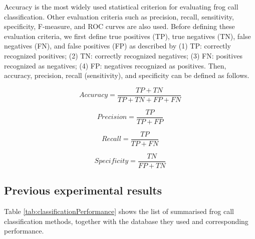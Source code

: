 Accuracy is the most widely used statistical criterion for evaluating frog call classification. Other evaluation criteria such as precision, recall, sensitivity, specificity, F-measure, and ROC curves are also used. Before defining these evaluation criteria, we first define true positives (TP), true negatives (TN), false negatives (FN), and false positives (FP) as described by  \citep{gordon2003sequence} 
(1) TP: correctly recognized positives;
(2) TN: correctly recognized negatives;
(3) FN: positives recognized as negatives;
(4) FP: negatives recognized as positives.
Then, accuracy, precision, recall (sensitivity), and specificity can be defined as follows.

\begin{equation}
Accuracy = \frac{TP+TN}{TP+TN+FP+FN}
\end{equation}

\begin{equation}
Precision = \frac{TP}{TP+FP}
\end{equation}

\begin{equation}
Recall = \frac{TP}{TP+FN}
\end{equation}

\begin{equation}
Specificity = \frac{TN}{FP+TN}
\end{equation}


\subsection{Previous experimental results}


Table \ref{tab:classificationPerformance} shows the list of summarised frog call classification methods, together with the database they used and corresponding performance.



